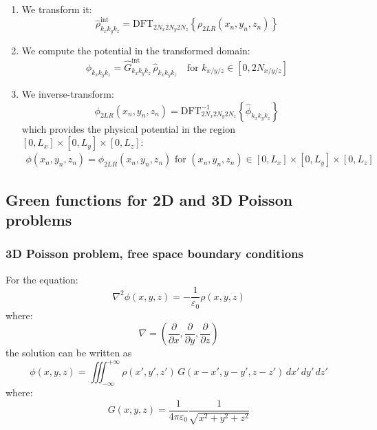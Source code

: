 \begin{enumerate}
\item We transform it:
\begin{equation}
\hat{\rho}^\text{int}_{k_x k_y k_z} = 
\text{DFT}_{2N_x 2N_y 2N_z}\left\{ \rho_{2LR}(x_n, y_n, z_n)\right\}
\end{equation}
\item We compute the potential in the transformed domain:
\begin{equation}
\hat{\phi}_{k_x k_y k_z} = \hat{G}^\text{int}_{k_x k_y k_z} \, \hat{\rho}_{k_x k_y k_z} \quad \text{for } k_{x/y/z}\in [0, 2N_{x/y/z}]
\end{equation}
\item We inverse-transform:
\begin{equation}
\phi_{2LR}(x_n, y_n, z_n)  = \text{DFT}_{2N_x 2N_y 2N_z}^{-1}
\left\{\hat{\phi}_{k_x k_y k_z}\right\}
\end{equation}
which provides the physical potential in the region $[0, L_x]\times[0, L_y]\times[0, L_z]$:
\begin{multline}
\phi(x_n, y_n, z_n) = \phi_{2LR}(x_n, y_n, z_n)  
\text{ for } (x_n, y_n, z_n) \in [0, L_x]\times[0, L_y]\times[0, L_z]
\end{multline}
\end{enumerate}

 
\subsection{Green functions for 2D and 3D Poisson problems}

\subsubsection*{3D Poisson problem, free space boundary conditions}

For the equation:
\begin{equation}
\nabla^2 \phi(x,y,z) = -\frac{1}{\varepsilon_0} \rho(x,y,z)
\end{equation}
where:
\begin{equation}
\nabla = \left(\frac{\partial}{\partial x}, 
                      \frac{\partial}{\partial y},
                      \frac{\partial}{\partial z} \right)
\end{equation}
the solution can be written as 
\begin{equation}
\phi(x, y, z) = \iiint_{-\infty}^{+\infty} \rho(x', y', z')
   \,G(x-x', y-y', z-z')\,dx'\,dy'\,dz'
\end{equation}
where:
\begin{equation}
G(x, y, z) = \frac{1}{4\pi\varepsilon_0}\frac{1}{
\sqrt{x^2 +y^2 +z^2}
}
\end{equation}

